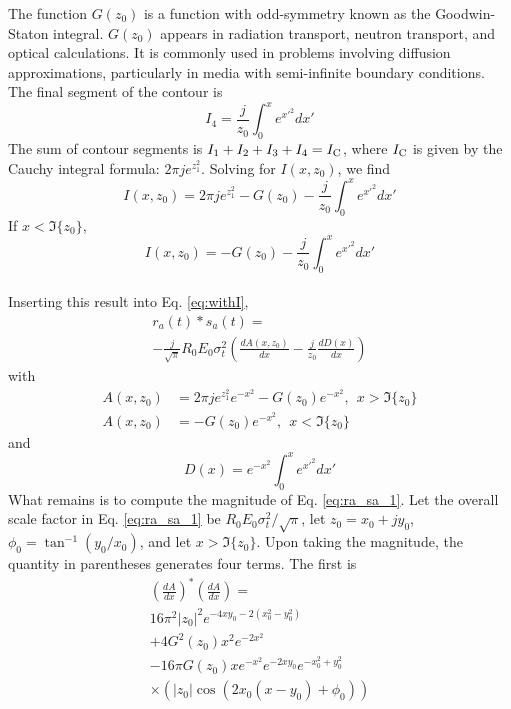 \documentclass[amsmath,amssymb,aps,prd,10pt,twocolumn,showkeys]{revtex4}
\begin{document}
\begin{itemize}
The function $G(z_0)$ is a function with odd-symmetry known as the Goodwin-Staton integral.  $G(z_0)$ appears in radiation transport, neutron transport, and optical calculations.  It is commonly used in problems involving diffusion approximations, particularly in media with semi-infinite boundary conditions. The final segment of the contour is
\begin{equation}
I_4 = \frac{j}{z_0}\int_{0}^{x} e^{x'^2} dx'
\end{equation}
The sum of contour segments is $I_1 + I_2 + I_3 + I_4 = I_{\rm C}$, where $I_{\rm C}$ is given by the Cauchy integral formula: $2\pi j e^{z_1^2}$.  Solving for $I(x,z_0)$, we find
\begin{equation}
I(x,z_0) = 2\pi j e^{z_1^2} - G(z_0) - \frac{j}{z_0}\int_{0}^{x} e^{x'^2} dx'
\end{equation}
If $x < \Im\lbrace z_0\rbrace$,
\begin{equation}
I(x,z_0) = -G(z_0) - \frac{j}{z_0}\int_{0}^{x} e^{x'^2} dx'
\end{equation} \\
Inserting this result into Eq. \ref{eq:withI},
\begin{multline}
r_a(t) * s_a(t) = \\ -\frac{j}{\sqrt{\pi}} R_0 E_0 \sigma_t^2 \left(\frac{dA(x,z_0)}{dx}-\frac{j}{z_0}\frac{dD(x)}{dx} \right) \label{eq:ra_sa_1}
\end{multline}
with
\begin{align}
A(x,z_0) &= 2\pi j e^{z_1^2} e^{-x^2} - G(z_0)e^{-x^2}, ~~ x > \Im \lbrace z_0 \rbrace\\
A(x,z_0) &= -G(z_0)e^{-x^2}, ~~ x < \Im \lbrace z_0 \rbrace
\end{align}
and
\begin{equation}
D(x) = e^{-x^2} \int_{0}^{x} e^{x'^2} dx'
\end{equation}
What remains is to compute the magnitude of Eq. \ref{eq:ra_sa_1}.  Let the overall scale factor in Eq. \ref{eq:ra_sa_1} be $R_0 E_0 \sigma_t^2/\sqrt{\pi}$, let $z_0 = x_0 + j y_0$, $\phi_0 = \tan^{-1}(y_0/x_0)$, and let $x>\Im\lbrace z_0\rbrace$.  Upon taking the magnitude, the quantity in parentheses generates four terms.  The first is
\begin{multline}
\left(\frac{dA}{dx}\right)^{*}\left(\frac{dA}{dx}\right) = \\ 16\pi^2|z_0|^2 e^{-4x y_0 - 2(x_0^2-y_0^2)} \\ + 4G^2(z_0)x^2 e^{-2x^2} \\ - 16\pi G(z_0) x e^{-x^2}e^{-2xy_0} e^{-x_0^2+y_0^2} \\ \times \left(|z_0|\cos(2x_0(x-y_0)+\phi_0) \right)

\end{multline}
\end{itemize}
\end{document}
